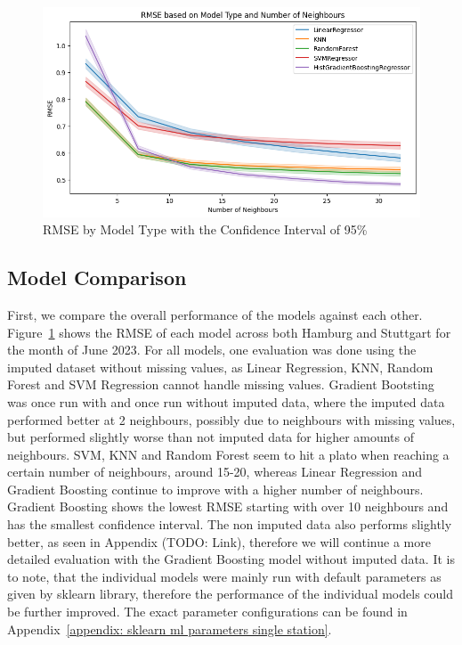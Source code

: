\begin{figure}[ht]
  \centering
  \includegraphics[width=1\textwidth]{images/rmse_by_model_type.png}
  \caption{RMSE by Model Type with the Confidence Interval of 95\%}
  \label{fig:rmse by model type}
\end{figure}

\subsection{Model Comparison}

First, we compare the overall performance of the models against each other. Figure~\ref{fig:rmse by model type} shows the RMSE of each model across both Hamburg and Stuttgart for the month of June 2023. For all models, one evaluation was done using the imputed dataset without missing values, as Linear Regression, KNN, Random Forest and SVM Regression cannot handle missing values. Gradient Bootsting was once run with and once run without imputed data, where the imputed data performed better at 2 neighbours, possibly due to neighbours with missing values, but performed slightly worse than not imputed data for higher amounts of neighbours. SVM, KNN and Random Forest seem to hit a plato when reaching a certain number of neighbours, around 15-20, whereas Linear Regression and Gradient Boosting continue to improve with a higher number of neighbours.\\
Gradient Boosting shows the lowest RMSE starting with over 10 neighbours and has the smallest confidence interval. The non imputed data also performs slightly better, as seen in Appendix (TODO: Link), therefore we will continue a more detailed evaluation with the Gradient Boosting model without imputed data. It is to note, that the individual models were mainly run with default parameters as given by sklearn library, therefore the performance of the individual models could be further improved. The exact parameter configurations can be found in Appendix~\ref{appendix: sklearn ml parameters single station}.

